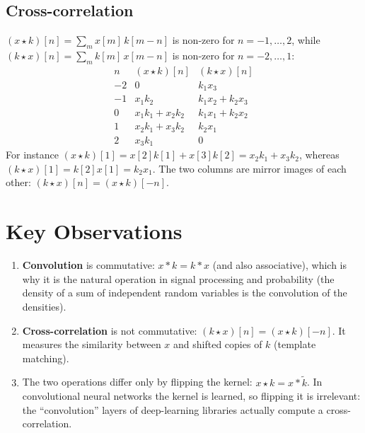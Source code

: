 \begin{notechapter}
\subsection{Cross-correlation}
\( (x \star k)[n] = \sum_m x[m]\,k[m-n] \) is non-zero for $n = -1, \dots, 2$, while
\( (k \star x)[n] = \sum_m k[m]\,x[m-n] \) is non-zero for $n = -2, \dots, 1$:
\[
\begin{array}{c|c|c}
n & (x \star k)[n] & (k \star x)[n] \\ \hline
-2 & 0 & k_1 x_3 \\
-1 & x_1 k_2 & k_1 x_2 + k_2 x_3 \\
0 & x_1 k_1 + x_2 k_2 & k_1 x_1 + k_2 x_2 \\
1 & x_2 k_1 + x_3 k_2 & k_2 x_1 \\
2 & x_3 k_1 & 0
\end{array}
\]
For instance \( (x \star k)[1] = x[2]k[1] + x[3]k[2] = x_2k_1 + x_3k_2 \), whereas
\( (k \star x)[1] = k[2]x[1] = k_2 x_1 \). The two columns are mirror images of each other:
\( (k \star x)[n] = (x \star k)[-n] \).

\section{Key Observations}
\begin{enumerate}
\item \textbf{Convolution} is commutative: \( x * k = k * x \) (and also associative),
      which is why it is the natural operation in signal processing and probability
      (the density of a sum of independent random variables is the convolution of the densities).
\item \textbf{Cross-correlation} is not commutative: \( (k \star x)[n] = (x \star k)[-n] \).
      It measures the similarity between $x$ and shifted copies of $k$ (template matching).
\item The two operations differ only by flipping the kernel: \( x \star k = x * \tilde{k} \).
      In convolutional neural networks the kernel is learned, so flipping it is irrelevant:
      the ``convolution'' layers of deep-learning libraries actually compute a cross-correlation.
\end{enumerate}
\end{notechapter}
